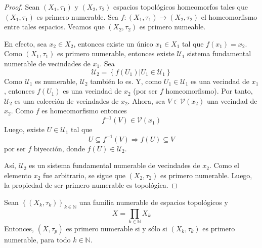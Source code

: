 \documentclass[12pt]{report}
\theoremstyle{largebreak}
\newcommand\cf[3]{\ensuremath{#1:#2\rightarrow#3}}
\begin{document}
    \begin{proof}
        Sean $(X_1,\tau_1)$ y $(X_2,\tau_2)$ espacios topológicos homeomorfos tales que $(X_1,\tau_1)$ es primero numerable. Sea $\cf{f}{(X_1,\tau_1)}{(X_2,\tau_2)}$ el homeomorfismo entre tales espacios. Veamos que $(X_2,\tau_2)$ es primero numeable.

        En efecto, sea $x_2\in X_2$, entonces existe un único $x_1\in X_1$ tal que $f(x_1)=x_2$. Como $(X_1,\tau_1)$ es primero numerable, entonces existe $\mathcal{U}_1$ sistema fundamental numerable de vecindades de $x_1$. Sea
        \begin{equation*}
            \mathcal{U}_2=\left\{f(U_1)\Big|U_1\in\mathcal{U}_1 \right\}
        \end{equation*}
        Como $\mathcal{U}_1$ es numerable, $\mathcal{U}_2$ también lo es. Y, como $U_1\in\mathcal{U}_1$ es una vecindad de $x_1$, entonces $f(U_1)$ es una vecindad de $x_2$ (por ser $f$ homeomorfismo). Por tanto, $\mathcal{U}_2$ es una colección de vecindades de $x_2$. Ahora, sea $V\in\mathcal{V}(x_2)$ una vecindad de $x_2$. Como $f$ es homeomorfismo entonces
        \begin{equation*}
            f^{-1}(V)\in\mathcal{V}(x_1)
        \end{equation*}
        Luego, existe $U\in\mathcal{U}_1$ tal que
        \begin{equation*}
            U\subseteq f^{-1}(V)\Rightarrow f(U)\subseteq V
        \end{equation*}
        por ser $f$ biyección, donde $f(U)\in\mathcal{U}_2$.

        Así, $\mathcal{U}_2$ es un sistema fundamental numerable de vecindades de $x_2$. Como el elemento $x_2$ fue arbitrario, se sigue que $(X_2,\tau_2)$ es primero numerable. Luego, la propiedad de ser primero numerable es topológica.
    \end{proof}

    \begin{propo}
        Sean $\left\{(X_k,\tau_k) \right\}_{ k\in\mathbb{N}}$ una familia numerable de espacios topológicos y
        \begin{equation*}
            X=\prod_{ k\in\mathbb{N}}X_k
        \end{equation*}
        Entonces, $(X,\tau_p)$ es primero numerable si y sólo si $(X_k,\tau_k)$ es primero numerable, para todo $k\in\mathbb{N}$.
    \end{propo}
\end{document}

